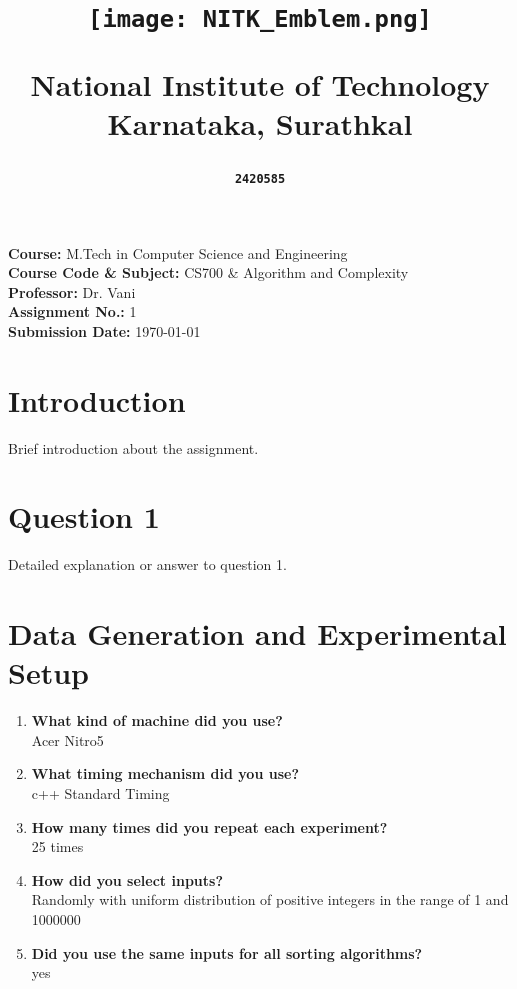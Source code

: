 \documentclass[a4paper,12pt]{article}
\title{

		\begin{minipage}{0.15\textwidth}
			\texttt{[image: NITK\_Emblem.png]} %
		\end{minipage}%
		\begin{minipage}{0.85\textwidth}
			\centering
			\textbf{National Institute of Technology Karnataka, Surathkal}
		\end{minipage}
}
\author{
	\begin{minipage}[t]{0.45\textwidth}
		\flushleft{\textbf{Dileep Reddy Gosu}}
	\end{minipage}
	\begin{minipage}[t]{0.45\textwidth}
		\flushright
		\texttt{\textbf{2420585}}
	\end{minipage}
}
\date{
 \begin{minipage}[t]{0.40\textwidth}
	\flushleft
	CSE
\end{minipage}%
\begin{minipage}[t]{0.5\textwidth}
	\flushright
	\today
	\end{minipage}}
\begin{document}
	
	\maketitle
	\headrule
	\vspace{6cm}
	\begin{center}
		\textbf{\Large Course:} \large{M.Tech in Computer Science and Engineering} \\
		\vspace{0.5cm}
		\textbf{\Large Course Code \& Subject:} \large{CS700 \& Algorithm and Complexity} \\
		\vspace{0.5cm}
		\textbf{\Large Professor:} \large{Dr. Vani} \\
		\vspace{0.5cm}
		\textbf{\Large Assignment No.:} \large{1} \\
		\vspace{0.5cm}
		\textbf{\Large Submission Date:} \large{\today} \\
	\end{center}
	\clearpage
	\tableofcontents
	\clearpage
	\setcounter{page}{1}
	\section*{Introduction}
	Brief introduction about the assignment.
	\section*{Question 1}
	Detailed explanation or answer to question 1.
	\section{Data Generation and Experimental Setup}
	\begin{enumerate}
		\item \textbf{What kind of machine did you use?}\\ 
		 Acer Nitro5
		\item \textbf{What timing mechanism did you use?} \\
		c++ Standard Timing
		\item \textbf{How many times did you repeat each experiment?}\\
		25 times
		\item \textbf{How did you select inputs?} \\
		Randomly with uniform distribution of positive integers in the range of 1 and 1000000
		\item \textbf{Did you use the same inputs for all sorting algorithms?} \\
		yes
	\end{enumerate}
\end{document}
